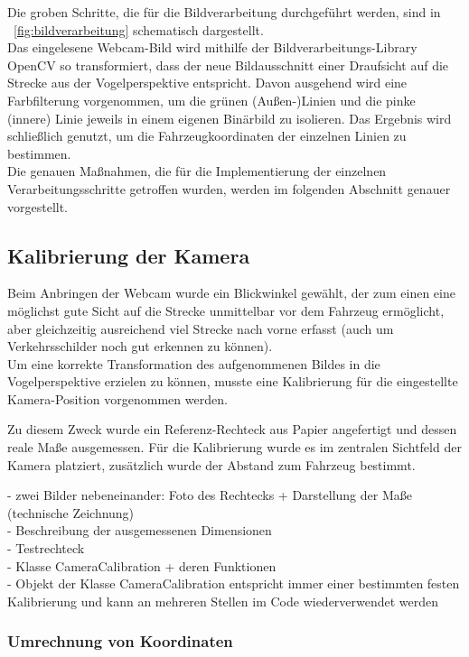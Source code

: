Die groben Schritte, die f\"ur die Bildverarbeitung durchgef\"uhrt werden, sind in \figurename\ \ref{fig:bildverarbeitung} schematisch dargestellt.\\
Das eingelesene Webcam-Bild wird mithilfe der Bildverarbeitungs-Library OpenCV so transformiert, dass
der neue Bildausschnitt einer Draufsicht auf die Strecke aus der Vogelperspektive entspricht.
Davon ausgehend wird eine Farbfilterung vorgenommen, um die gr\"unen (Au\ss en-)Linien und die
pinke (innere) Linie jeweils in einem eigenen Bin\"arbild zu isolieren. Das Ergebnis wird
schlie\ss lich genutzt, um die Fahrzeugkoordinaten der einzelnen Linien zu bestimmen.\\
Die genauen Ma\ss nahmen, die f\"ur die Implementierung der einzelnen Verarbeitungsschritte getroffen 
wurden, werden im folgenden Abschnitt genauer vorgestellt.


\subsection{Kalibrierung der Kamera}

Beim Anbringen der Webcam wurde ein Blickwinkel gew\"ahlt, der zum einen eine m\"oglichst gute Sicht auf die
Strecke unmittelbar vor dem Fahrzeug erm\"oglicht, aber gleichzeitig ausreichend viel Strecke nach
vorne erfasst (auch um Verkehrsschilder noch gut erkennen zu k\"onnen).\\
Um eine korrekte Transformation des aufgenommenen Bildes in die Vogelperspektive erzielen zu
k\"onnen, musste eine Kalibrierung f\"ur die eingestellte Kamera-Position vorgenommen werden.

Zu diesem Zweck wurde ein Referenz-Rechteck aus Papier angefertigt und dessen reale Ma\ss e ausgemessen.
F\"ur die Kalibrierung wurde es im zentralen Sichtfeld der Kamera platziert, zus\"atzlich wurde der
Abstand zum Fahrzeug bestimmt.

- zwei Bilder nebeneinander: Foto des Rechtecks + Darstellung der Ma\ss e (technische Zeichnung)\\
- Beschreibung der ausgemessenen Dimensionen\\
- Testrechteck\\
- Klasse CameraCalibration + deren Funktionen\\
- Objekt der Klasse CameraCalibration entspricht immer einer bestimmten festen Kalibrierung und kann
an mehreren Stellen im Code wiederverwendet werden\\


\subsubsection{Umrechnung von Koordinaten}

